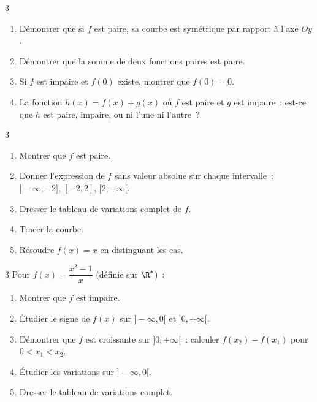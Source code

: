 \begin{exo}{3}
\begin{enumerate}
  \item D\'emontrer que si $f$ est paire, sa courbe est sym\'etrique par
        rapport \`a l'axe $Oy$.
  \item D\'emontrer que la somme de deux fonctions paires est paire.
  \item Si $f$ est impaire et $f(0)$ existe, montrer que $f(0)=0$.
  \item La fonction $h(x)=f(x)+g(x)$ o\`u $f$ est paire et $g$ est impaire~:
        est-ce que $h$ est paire, impaire, ou ni l'une ni l'autre~?
\end{enumerate}
\end{exo}

\begin{exo}[$f(x)=|x^2-4|$~: \'etude compl\`ete \corrige]{3}
\begin{enumerate}
  \item Montrer que $f$ est paire.
  \item Donner l'expression de $f$ sans valeur absolue sur chaque intervalle~:
        $]-\infty,-2]$, $[-2,2]$, $[2,+\infty[$.
  \item Dresser le tableau de variations complet de $f$.
  \item Tracer la courbe.
  \item R\'esoudre $f(x)=x$ en distinguant les cas.
\end{enumerate}
\end{exo}

\begin{exo}{3}
Pour $f(x)=\dfrac{x^2-1}{x}$ (d\'efinie sur $\R^*$)~:
\begin{enumerate}
  \item Montrer que $f$ est impaire.
  \item \'Etudier le signe de $f(x)$ sur $]-\infty,0[$ et $]0,+\infty[$.
  \item D\'emontrer que $f$ est croissante sur $]0,+\infty[$~:
        calculer $f(x_2)-f(x_1)$ pour $0<x_1<x_2$.
  \item \'Etudier les variations sur $]-\infty,0[$.
  \item Dresser le tableau de variations complet.
\end{enumerate}
\end{exo}

